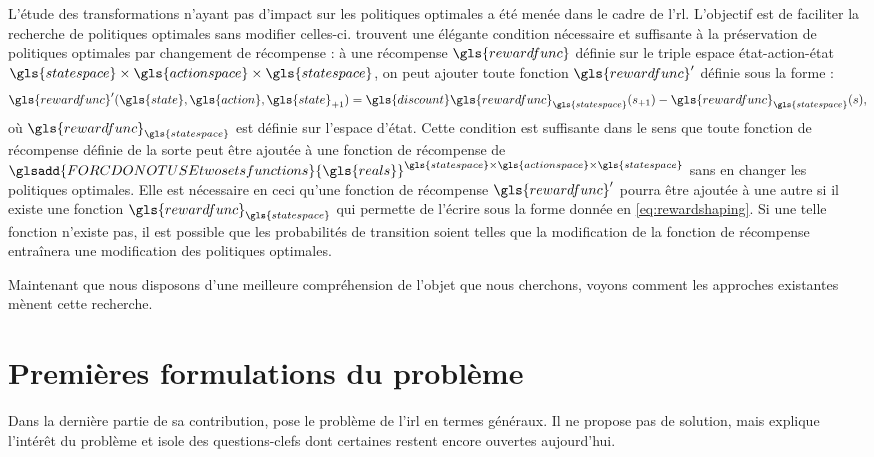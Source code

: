 \documentclass[frenchb,a4paper,justified,notoc]{tufte-book}
\newcommand{\rewardfunc}{\gls{rewardfunc}}
\newcommand{\discount}{\gls{discount}}
\newcommand{\state}{\gls{state}}
\newcommand{\action}{\gls{action}}
\newcommand{\statespace}{\gls{statespace}}
\newcommand{\reals}{\gls{reals}}
\newcommand{\actionspace}{\gls{actionspace}}
\newcommand{\twosetsfunctions}[2]{\ensuremath{\glsadd{FORCDONOTUSEtwosetsfunctions}{#2}^{#1}}}
\begin{document}
L'étude des transformations n'ayant pas d'impact sur les politiques optimales a été menée dans le cadre de l'\gls{rl}. L'objectif est de faciliter la recherche de politiques optimales sans modifier celles-ci. \citet{ng1999policy} trouvent une élégante condition nécessaire et suffisante à la préservation de politiques optimales par changement de récompense : à une récompense $\rewardfunc$ définie sur le triple espace état-action-état $\statespace \times \actionspace \times \statespace$, on peut ajouter toute fonction $\rewardfunc'$ définie sous la forme : 
\begin{equation}
\label{eq:rewardshaping}
\rewardfunc'(\state,\action,\state_{+1}) = \discount\rewardfunc_{\statespace}(s_{+1}) -  \rewardfunc_{\statespace}(s),
\end{equation}
où $\rewardfunc_{\statespace}$ est définie sur l'espace d'état. Cette condition est suffisante dans le sens que toute fonction de récompense définie de la sorte peut être ajoutée à une fonction de récompense de $\twosetsfunctions{\statespace \times \actionspace \times \statespace}{\reals}$ sans en changer les politiques optimales. Elle est nécessaire en ceci qu'une fonction de récompense $\rewardfunc'$ pourra être ajoutée à une autre si il existe une fonction $\rewardfunc_{\statespace}$ qui permette de l'écrire sous la forme donnée en \autoref{eq:rewardshaping}. Si une telle fonction n'existe pas, il est possible que les probabilités de transition soient telles que la modification de la fonction de récompense entraînera une modification des politiques optimales.


Maintenant que nous disposons d'une meilleure compréhension de l'objet que nous cherchons, voyons comment les approches existantes mènent cette recherche.
\section{Premières formulations du problème}
\label{sec-3-2}

   Dans la dernière partie de sa contribution, \citet{russell1998learning} pose le problème de l'\gls{irl} en termes généraux. Il ne propose pas de solution, mais explique l'intérêt du problème et isole des questions-clefs dont certaines restent encore ouvertes aujourd'hui.
\end{document}
